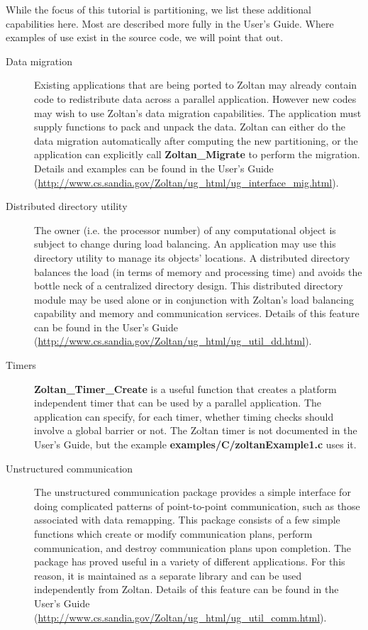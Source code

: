 While the focus of this tutorial is partitioning, we list these additional
capabilities here.  Most are described more fully in the User's Guide.
Where examples of use exist in the source code, we will point that out.

\begin{description}
\item [Data migration]
Existing applications that are being ported to Zoltan may already contain code to
redistribute data across a parallel application.  However new codes may wish to
use Zoltan's data migration capabilities.  The application must supply functions
to pack and unpack the data.  Zoltan can either do the data migration automatically
after computing the new partitioning, or the application can explicitly call
\textbf{Zoltan\_Migrate} to perform the migration.
Details and examples can be
found in the User's Guide
(\url{http://www.cs.sandia.gov/Zoltan/ug\_html/ug\_interface\_mig.html}).


\item [Distributed directory utility]
The owner (i.e. the processor number) of any computational object is subject to
change during load balancing. An application may use this directory utility to
manage its objects' locations. A distributed directory balances the load (in terms
of memory and processing time) and avoids the bottle neck of a centralized directory design.
This distributed directory module may be used alone or in conjunction with Zoltan's
load balancing capability and memory and communication services.
Details of this feature can be found in the User's Guide
(\url{http://www.cs.sandia.gov/Zoltan/ug\_html/ug\_util\_dd.html}).

\item [Timers]
\textbf{Zoltan\_Timer\_Create} is a useful function
that creates a platform independent
timer that can be used by a parallel application.  The application can
specify, for each timer, whether timing checks should involve a
global barrier or not.  The Zoltan timer is not documented in the User's
Guide, but the example \textbf{examples/C/zoltanExample1.c} uses it.

\item [Unstructured communication]
The unstructured communication package provides a simple interface for
doing complicated patterns of point-to-point communication, such as those
associated with data remapping. This package consists of a few simple functions
which create or modify communication plans, perform communication, and destroy
communication plans upon completion. The package has proved useful in a
variety of different applications. For this reason, it is maintained as a separate
library and can be used independently from Zoltan.
Details of this feature can be found in the User's Guide
(\url{http://www.cs.sandia.gov/Zoltan/ug\_html/ug\_util\_comm.html}).


\end{description}
